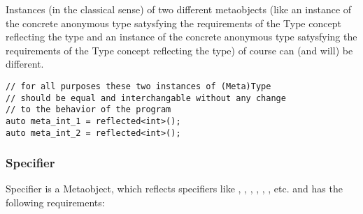 Instances (in the classical sense) of two different metaobjects (like an instance
of the concrete anonymous type satysfying the requirements of the {\metaobject Type} concept
reflecting the \verb@int@ type and an instance 
of the concrete anonymous type satysfying the requirements of the {\metaobject Type} concept
reflecting the \verb@double@ type) of course can (and will) be different.

\begin{lstlisting}
// for all purposes these two instances of (Meta)Type
// should be equal and interchangable without any change
// to the behavior of the program
auto meta_int_1 = reflected<int>();
auto meta_int_2 = reflected<int>();
\end{lstlisting}

\subsubsection{Specifier}

{\metaobject Specifier} is a {\metaobject Metaobject}, which reflects specifiers like
\verb@const@, \verb@volatile@, \verb@private@,
\verb@protected@, \verb@public@, \verb@virtual@, etc. and has the following
requirements:

